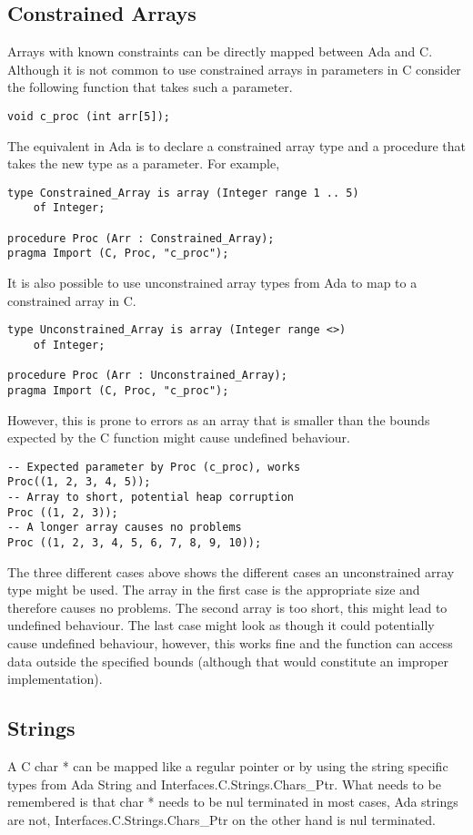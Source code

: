 \subsection{Constrained Arrays}\label{sec:costrarray}
Arrays with known constraints can be directly mapped between Ada and C. Although it is not common to use constrained arrays in parameters in C consider the following function that takes such a parameter.
\begin{lstlisting}
void c_proc (int arr[5]);
\end{lstlisting}
The equivalent in Ada is to declare a constrained array type and a procedure that takes the new type as a parameter. For example,
\begin{lstlisting}
type Constrained_Array is array (Integer range 1 .. 5) 
	of Integer;

procedure Proc (Arr : Constrained_Array);
pragma Import (C, Proc, "c_proc");
\end{lstlisting}
It is also possible to use unconstrained array types from Ada to map to a constrained array in C.
\begin{lstlisting}
type Unconstrained_Array is array (Integer range <>) 
	of Integer;

procedure Proc (Arr : Unconstrained_Array);
pragma Import (C, Proc, "c_proc");
\end{lstlisting}
However, this is prone to errors as an array that is smaller than the bounds expected by the C function might cause undefined behaviour.
\begin{lstlisting}
-- Expected parameter by Proc (c_proc), works
Proc((1, 2, 3, 4, 5));
-- Array to short, potential heap corruption 
Proc ((1, 2, 3));
-- A longer array causes no problems
Proc ((1, 2, 3, 4, 5, 6, 7, 8, 9, 10)); 
\end{lstlisting}
The three different cases above shows the different cases an unconstrained array type might be used. The array in the first case is the appropriate size and therefore causes no problems. The second array is too short, this might lead to undefined behaviour. The last case might look as though it could potentially cause undefined behaviour, however, this works fine and the function can access data outside the specified bounds (although that would constitute an improper implementation).
\subsection{Strings}\label{sec:cstrings}
A C char * can be mapped like a regular pointer or by using the string specific types from Ada String and Interfaces.C.Strings.Chars_Ptr. What needs to be remembered is that char * needs to be nul terminated in most cases, Ada strings are not, Interfaces.C.Strings.Chars_Ptr on the other hand is nul terminated.
